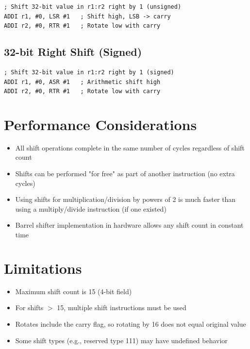 \begin{lstlisting}
; Shift 32-bit value in r1:r2 right by 1 (unsigned)
ADDI r1, #0, LSR #1   ; Shift high, LSB -> carry
ADDI r2, #0, RTR #1   ; Rotate low with carry
\end{lstlisting}

\subsection{32-bit Right Shift (Signed)}

\begin{lstlisting}
; Shift 32-bit value in r1:r2 right by 1 (signed)
ADDI r1, #0, ASR #1   ; Arithmetic shift high
ADDI r2, #0, RTR #1   ; Rotate low with carry
\end{lstlisting}

\section{Performance Considerations}

\begin{itemize}
	\item All shift operations complete in the same number of cycles regardless of shift count
	\item Shifts can be performed "for free" as part of another instruction (no extra cycles)
	\item Using shifts for multiplication/division by powers of 2 is much faster than using a multiply/divide instruction (if one
	      existed)
	\item Barrel shifter implementation in hardware allows any shift count in constant time
\end{itemize}

\section{Limitations}

\begin{itemize}
	\item Maximum shift count is 15 (4-bit field)
	\item For shifts $>$ 15, multiple shift instructions must be used
	\item Rotates include the carry flag, so rotating by 16 does not equal original value
	\item Some shift types (e.g., reserved type 111) may have undefined behavior
\end{itemize}

